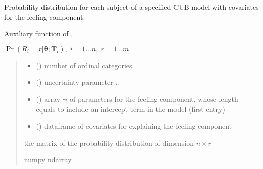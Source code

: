 \documentclass[letterpaper,10pt,english]{sphinxmanual}
\begin{document}

\begin{fulllineitems}
\label{\detokenize{cubmods:cubmods.cub_0w.pmfi}}
\pysigstartsignatures
{}
\pysigstopsignatures
\sphinxAtStartPar
Probability distribution for each subject of a specified CUB model 
with covariates for the feeling component.

\sphinxAtStartPar
Auxiliary function of .

\sphinxAtStartPar
\(\Pr(R_i=r|\pmb\theta; \pmb T_i),\; i=1 \ldots n ,\; r=1 \ldots m\)
\begin{quote}\begin{description}
\begin{itemize}
\item {} 
\sphinxAtStartPar
{} () \textendash{} number of ordinal categories

\item {} 
\sphinxAtStartPar
{} () \textendash{} uncertainty parameter \(\pi\)

\item {} 
\sphinxAtStartPar
{} () \textendash{} array \(\pmb \gamma\) of parameters for the feeling component, whose length equals 
 to include an intercept term in the model (first entry)

\item {} 
\sphinxAtStartPar
{} () \textendash{} dataframe of covariates for explaining the feeling component

\end{itemize}

\sphinxAtStartPar
the matrix of the probability distribution of dimension \(n \times r\)

\sphinxAtStartPar
numpy ndarray

\end{description}\end{quote}

\end{fulllineitems}
\end{document}
